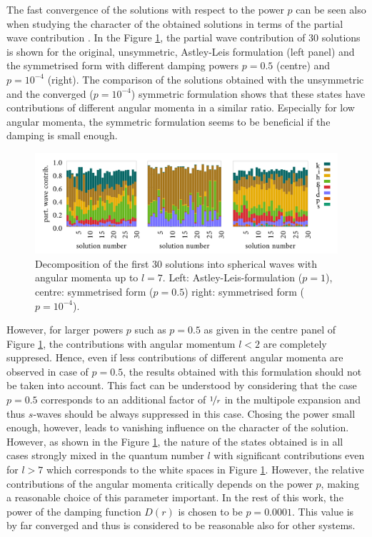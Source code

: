 The fast convergence of the solutions with respect to the power $p$ can be seen also when studying the character of the obtained solutions in terms of the partial wave contribution .
In the Figure \ref{fig:IFEMform_project}, the partial wave contribution of $30$ solutions is shown for the original, unsymmetric, Astley-Leis formulation (left panel) and the symmetrised form with different damping powers $p=0.5$ (centre) and $p=10^{-4}$ (right).
The comparison of the solutions obtained with the unsymmetric and the converged ($p=10^{-4}$) symmetric formulation shows that these states have contributions of different angular momenta in a similar ratio.
Especially for low angular momenta, the symmetric formulation seems to be beneficial if the damping is small enough.
\begin{figure}[h]
\includegraphics[width=\textwidth]{Figures/Ifem_forms}
\caption{Decomposition of the first $30$ solutions into spherical waves with angular momenta up to $l=7$.
Left: Astley-Leis-formulation ($p=1$), centre: symmetrised form ($p=0.5$) right: symmetrised form ($p=10^{-4}$).}
\label{fig:IFEMform_project}
\end{figure}
However, for larger powers $p$ such as $p=0.5$ as given in the centre panel of Figure \ref{fig:IFEMform_project}, the contributions with angular momentum $l<2$ are completely suppresed.
Hence, even if less contributions of different angular momenta are observed in case of $p=0.5$, the results obtained with this formulation should not be taken into account.
This fact can be understood by considering that the case $p=0.5$ corresponds to an additional factor of $\nicefrac{1}{r}$ in the multipole expansion and thus $s$-waves should be always suppressed in this case.
Chosing the power small enough, however, leads to vanishing influence on the character of the solution.
However, as shown in the Figure \ref{fig:IFEMform_project}, the nature of the states obtained is in all cases strongly mixed in the quantum number $l$ with significant contributions even for $l>7$ which corresponds to the white spaces in Figure \ref{fig:IFEMform_project}.
However, the relative contributions of the angular momenta critically depends on the power $p$, making a reasonable choice of this parameter important.
In the rest of this work, the power of the damping function $D(r)$ is chosen to be $p=0.0001$.
This value is by far converged and thus is considered to be reasonable also for other systems.

